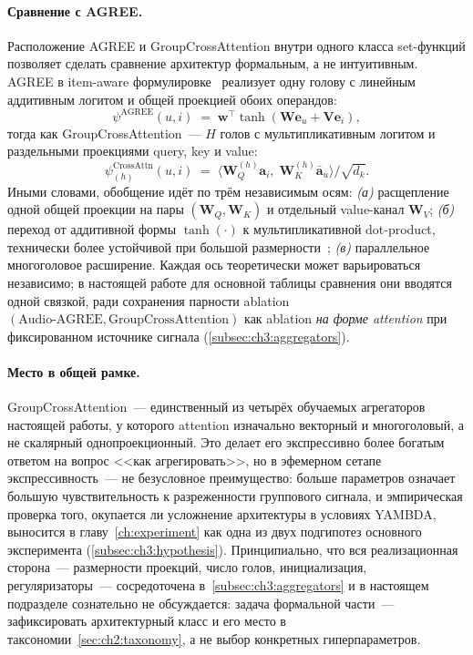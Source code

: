 \paragraph{Сравнение с AGREE.} Расположение AGREE и GroupCrossAttention внутри одного класса set-функций позволяет сделать сравнение архитектур формальным, а не интуитивным. AGREE в item-aware формулировке~\cite{cao2018agree} реализует одну голову с линейным аддитивным логитом и общей проекцией обоих операндов:
\begin{equation*}
    \psi^{\mathrm{AGREE}}(u, i) \;=\; \mathbf{w}^\top \tanh\!\left(\mathbf{W} \mathbf{e}_u + \mathbf{V} \mathbf{e}_i\right),
\end{equation*}
тогда как GroupCrossAttention~--- $H$ голов с мультипликативным логитом и раздельными проекциями query, key и value:
\begin{equation*}
    \psi^{\mathrm{CrossAttn}}_{(h)}(u, i)
    \;=\;
    \langle \mathbf{W}_Q^{(h)} \mathbf{a}_i,\; \mathbf{W}_K^{(h)} \bar{\mathbf{a}}_u \rangle / \sqrt{d_k}.
\end{equation*}
Иными словами, обобщение идёт по трём независимым осям: \emph{(а)} расщепление одной общей проекции на пары $(\mathbf{W}_Q, \mathbf{W}_K)$ и отдельный value-канал $\mathbf{W}_V$; \emph{(б)} переход от аддитивной формы $\tanh(\cdot)$ к мультипликативной dot-product, технически более устойчивой при большой размерности~\cite{vaswani2017attention}; \emph{(в)} параллельное многоголовое расширение. Каждая ось теоретически может варьироваться независимо; в настоящей работе для основной таблицы сравнения они вводятся одной связкой, ради сохранения парности ablation $(\text{Audio-AGREE}, \text{GroupCrossAttention})$ как ablation \emph{на форме attention} при фиксированном источнике сигнала (\ref{subsec:ch3:aggregators}).

\paragraph{Место в общей рамке.} GroupCrossAttention~--- единственный из четырёх обучаемых агрегаторов настоящей работы, у которого attention изначально векторный и многоголовый, а не скалярный однопроекционный. Это делает его экспрессивно более богатым ответом на вопрос <<как агрегировать>>, но в эфемерном сетапе экспрессивность~--- не безусловное преимущество: больше параметров означает большую чувствительность к разреженности группового сигнала, и эмпирическая проверка того, окупается ли усложнение архитектуры в условиях YAMBDA, выносится в главу~\ref{ch:experiment} как одна из двух подгипотез основного эксперимента (\ref{subsec:ch3:hypothesis}). Принципиально, что вся реализационная сторона~--- размерности проекций, число голов, инициализация, регуляризаторы~--- сосредоточена в~\ref{subsec:ch3:aggregators} и в настоящем подразделе сознательно не обсуждается: задача формальной части~--- зафиксировать архитектурный класс и его место в таксономии~\ref{sec:ch2:taxonomy}, а не выбор конкретных гиперпараметров.

